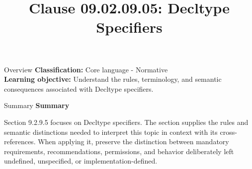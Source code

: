 \documentclass[10pt,letterpaper]{article}
\title{Clause 09.02.09.05: Decltype Specifiers}
\author{}
\date{}
\begin{document}
\maketitle
\begin{CornellOverviewBox}{Overview}
\textbf{Classification:} Core language - Normative\\[2pt]
\textbf{Learning objective:} Understand the rules, terminology, and semantic consequences associated with Decltype specifiers.
\end{CornellOverviewBox}\begin{CornellSummaryBox}{Summary}
{\sffamily\bfseries\color{Accent} Summary}\par\vspace{3pt}Section 9.2.9.5 focuses on Decltype specifiers. The section supplies the rules and semantic distinctions needed to interpret this topic in context with its cross-references. When applying it, preserve the distinction between mandatory requirements, recommendations, permissions, and behavior deliberately left undefined, unspecified, or implementation-defined.
\end{CornellSummaryBox}
\end{document}
